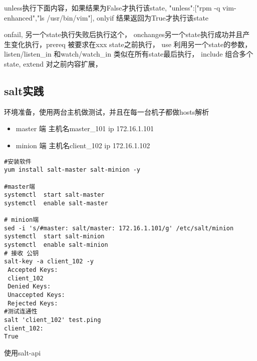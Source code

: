 unless执行下面内容，如果结果为False才执行该state, {"unless":["rpm -q vim-enhanced","ls /usr/bin/vim"]}, onlyif 结果返回为True才执行该state

 
onfail, 另一个state执行失败后执行这个， onchanges另一个state执行成功并且产生变化执行，prereq 被要求在xxx state之前执行， use 利用另一个state的参数，
listen/listen_in 和watch/watch_in 类似在所有state最后执行， include 组合多个state, extend 对之前内容扩展， 


\subsection{salt实践}

环境准备，使用两台主机做测试，并且在每一台机子都做hosts解析 

\begin{itemize}
\item master 端 主机名master_101 ip 172.16.1.101
\item minion 端 主机名client_102 ip 172.16.1.102
\end{itemize}

\begin{lstlisting}
#安装软件
yum install salt-master salt-minion -y

#master端
systemctl  start salt-master
systemctl  enable salt-master 

# minion端
sed -i 's/#master: salt/master: 172.16.1.101/g' /etc/salt/minion
systemctl  start salt-minion 
systemctl  enable salt-minion 
# 接收 公钥
salt-key -a client_102 -y
 Accepted Keys:
 client_102
 Denied Keys:
 Unaccepted Keys:
 Rejected Keys:
#测试连通性
salt 'client_102' test.ping
client_102:
True
\end{lstlisting}

使用salt-api

